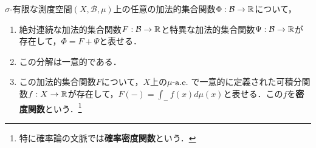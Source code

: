 \documentclass[uplatex, dvipdfmx]{jsreport}
\renewcommand{\B}{\mathcal{B}}
\begin{document}
\begin{theorem}\label{thm-Radon-Nykodym}
    $\sigma$-有限な測度空間$(X,\B,\mu)$上の任意の加法的集合関数$\Phi:\B\to\R$について，
    \begin{enumerate}
        \item 絶対連続な加法的集合関数$F:\B\to\R$と特異な加法的集合関数$\Psi:\B\to\R$が存在して，$\Phi=F+\Psi$と表せる．
        \item この分解は一意的である．
        \item この加法的集合関数$F$について，$X$上の$\mu$-$\mathrm{a.e.}\;$で一意的に定義された可積分関数$f:X\to\mathbb{R}$が存在して，$F(-)=\int_{-}f(x)d\mu(x)$と表せる．この$f$を\textbf{密度関数}という．\footnote{特に確率論の文脈では\textbf{確率密度関数}という．}
    \end{enumerate}
\end{theorem}
\end{document}
